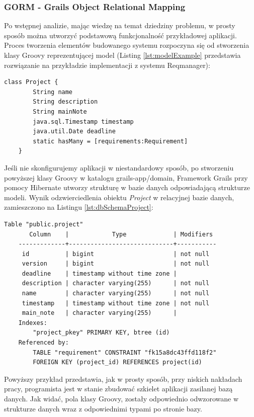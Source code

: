     \subsubsection{GORM - Grails Object Relational Mapping}
  
    Po wstępnej analizie, mając wiedzę na temat dziedziny problemu, w prosty sposób można utworzyć podstawową funkcjonalność przykładowej aplikacji. Proces tworzenia elementów budowanego systemu rozpoczyna się od stworzenia klasy Groovy reprezentującej model (Listing \ref{lst:modelExample} przedstawia rozwiązanie na przykładzie implementacji z systemu Reqmanager):

    \begin{lstlisting}[caption={Klasa modelu Project.groovy}, label={lst:modelExample}]
    class Project {
        String name
        String description
        String mainNote
        java.sql.Timestamp timestamp
        java.util.Date deadline
        static hasMany = [requirements:Requirement]
    }
    \end{lstlisting}

    Jeśli nie skonfigurujemy aplikacji w niestandardowy sposób, po stworzeniu powyższej klasy Groovy w katalogu grails-app/domain, Framework Grails przy pomocy Hibernate utworzy strukturę w bazie danych odpowiadającą strukturze modeli. Wynik odzwierciedlenia obiektu \emph{Project} w relacyjnej bazie danych, zamieszczono na Listingu \ref{lst:dbSchemaProject}:

    \begin{lstlisting}[caption={Struktura bazy danych dla modelu Project}, label={lst:dbSchemaProject}]
                      Table "public.project"
       Column    |            Type             | Modifiers 
    -------------+-----------------------------+-----------
     id          | bigint                      | not null
     version     | bigint                      | not null
     deadline    | timestamp without time zone | 
     description | character varying(255)      | not null
     name        | character varying(255)      | not null
     timestamp   | timestamp without time zone | not null
     main_note   | character varying(255)      | 
    Indexes:
        "project_pkey" PRIMARY KEY, btree (id)
    Referenced by:
        TABLE "requirement" CONSTRAINT "fk15a8dc43ffd118f2" 
        FOREIGN KEY (project_id) REFERENCES project(id)
    \end{lstlisting}

    Powyższy przykład przedstawia, jak w prosty sposób, przy niskich nakładach pracy, programista jest w stanie zbudować szkielet aplikacji zasilanej bazą danych. Jak widać, pola klasy Groovy, zostały odpowiednio odwzorowane w strukturze danych wraz z odpowiednimi typami po stronie bazy.

